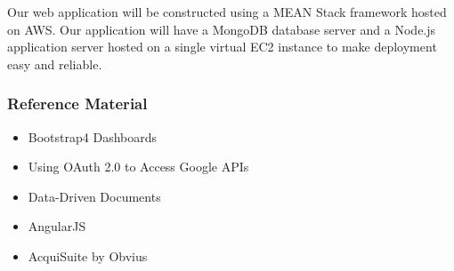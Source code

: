 \noindent Our web application will be constructed using a MEAN Stack framework hosted on AWS. Our application will have a MongoDB database server and a Node.js application server hosted on a single virtual EC2 instance to make deployment easy and reliable.

\subsubsection{Reference Material} 
    \begin{itemize}
        \item Bootstrap4 Dashboards \cite{dashboard_bootstrap} 
        \item Using OAuth 2.0 to Access Google APIs \cite{oauth} 
        \item Data-Driven Documents \cite{data_driven}
        \item AngularJS \cite{ng}
        \item AcquiSuite by Obvius \cite{AcquiSuite}
    \end{itemize} 
